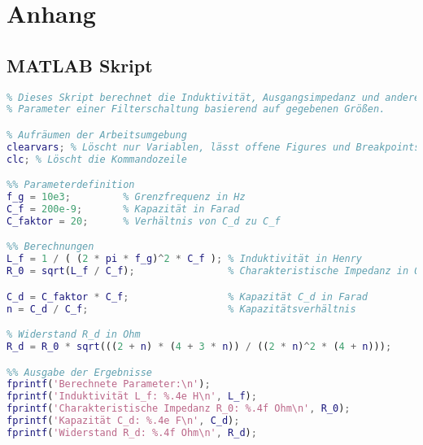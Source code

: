 \section{Anhang}\label{app:1}

\subsection{MATLAB Skript}\label{a1:matlab}

\begin{lstlisting}[language=Matlab, caption={MATLAB Script}, label={lst:matlab_script}]
%% Skript zur Berechnung von Filterschaltungen
% Dieses Skript berechnet die Induktivität, Ausgangsimpedanz und andere
% Parameter einer Filterschaltung basierend auf gegebenen Größen.

% Aufräumen der Arbeitsumgebung
clearvars; % Löscht nur Variablen, lässt offene Figures und Breakpoints unberührt
clc; % Löscht die Kommandozeile

%% Parameterdefinition
f_g = 10e3;         % Grenzfrequenz in Hz
C_f = 200e-9;       % Kapazität in Farad
C_faktor = 20;      % Verhältnis von C_d zu C_f

%% Berechnungen
L_f = 1 / ( (2 * pi * f_g)^2 * C_f ); % Induktivität in Henry
R_0 = sqrt(L_f / C_f);                % Charakteristische Impedanz in Ohm

C_d = C_faktor * C_f;                 % Kapazität C_d in Farad
n = C_d / C_f;                        % Kapazitätsverhältnis

% Widerstand R_d in Ohm
R_d = R_0 * sqrt(((2 + n) * (4 + 3 * n)) / ((2 * n)^2 * (4 + n)));

%% Ausgabe der Ergebnisse
fprintf('Berechnete Parameter:\n');
fprintf('Induktivität L_f: %.4e H\n', L_f);
fprintf('Charakteristische Impedanz R_0: %.4f Ohm\n', R_0);
fprintf('Kapazität C_d: %.4e F\n', C_d);
fprintf('Widerstand R_d: %.4f Ohm\n', R_d);
\end{lstlisting}